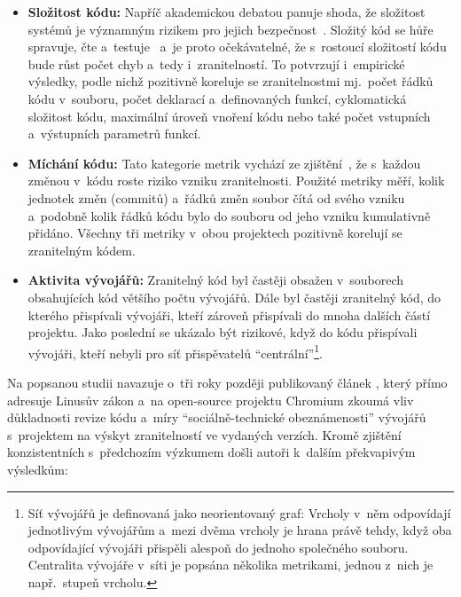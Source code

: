 \begin{itemize}
    \item \textbf{Složitost kódu:} \enskip
        Napříč akademickou debatou panuje shoda, že složitost systémů je vý\-znam\-ným rizikem pro jejich bezpečnost~\cite{youreallyshouldnt, oss2011, impact-openssl}. Složitý kód se hůře spravuje, čte a~testuje~\cite{mccabe1976complexity} a~je proto očekávatelné, že s~rostoucí složitostí kódu bude růst počet chyb a~tedy i~zranitelností. To potvrzují i~empirické výsledky, podle nichž pozitivně koreluje se zranitelnostmi mj.\ počet řádků kódu v~souboru, počet deklarací a~definovaných funkcí, cyklomatická složitost kódu, maximální úroveň vnoření kódu nebo také počet vstupních a~výstupních parametrů funkcí.
    \item \textbf{Míchání kódu:} \enskip
        Tato kategorie metrik vychází ze zjištění~\cite{nagappan2005use, graves2000predicting}, že s~každou změnou v~kódu roste riziko vzniku zranitelnosti. Použité metriky měří, kolik jednotek změn (commitů) a~řádků změn soubor čítá od svého vzniku a~podobně kolik řádků kódu bylo do souboru od jeho vzniku kumulativně přidáno. Všechny tři metriky v~obou projektech pozitivně korelují se zranitelným kódem.
    \item \textbf{Aktivita vývojářů:} \enskip
        Zranitelný kód byl častěji obsažen v~souborech obsahujících kód vět\-ší\-ho počtu vývojářů. Dále byl častěji zranitelný kód, do kterého přispívali vývojáři, kteří zá\-ro\-veň přispívali do mnoha dalších částí projektu. Jako poslední se ukázalo být rizikové, když do kódu přispívali vývojáři, kteří nebyli pro síť přispěvatelů ``centrální''\footnote{Síť vývojářů je definovaná jako neorientovaný graf: Vrcholy v~něm odpovídají jednotlivým vývojářům a~mezi dvěma vrcholy je hrana právě tehdy, když oba odpovídající vývojáři přispěli alespoň do jednoho společného souboru. Centralita vývojáře v~síti je popsána několika metrikami, jednou z~nich je např.\ stupeň vrcholu.}.
\end{itemize}

Na popsanou studii navazuje o~tři roky později publikovaný článek \cite{osslinuslaw2014}, který přímo adresuje Linusův zákon a~na open-source projektu Chromium zkoumá vliv důkladnosti revize kódu a~míry ``sociálně-technické obeznámenosti'' vývojářů s~projektem na výskyt zranitelností ve vydaných verzích. Kromě zjištění konzistentních s~předchozím výzkumem došli autoři k~dalším překvapivým výsledkům:

